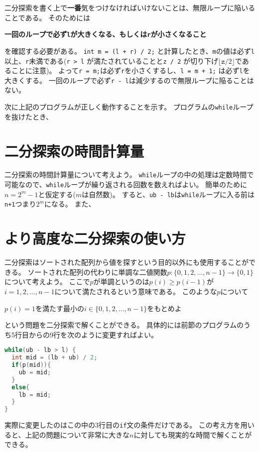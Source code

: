 \documentclass[a4paper,twoside,onecolumn,openany,article,10pt]{memoir}
\theoremstyle{remark}
\begin{document}
二分探索を書く上で\textbf{一番}気をつけなければいけないことは、無限ループに陥いることである。
そのためには
\begin{center}
\textbf{一回のループで必ず\texttt{l}が大きくなる、もしくは\texttt{r}が小さくなること}
\end{center}
を確認する必要がある。
\texttt{int m = (l + r) / 2;} と計算したとき、\texttt{m}の値は必ず\texttt{l}以上、\texttt{r}未満である(\texttt{r > l} が満たされていることと\texttt{z / 2} が切り下げ$\lfloor \mathtt{z} / 2\rfloor$であることに注意)。
よって\texttt{r = m;}は必ず\texttt{r}を小さくするし、\texttt{l = m + 1;} は必ず\texttt{l}を大きくする。
一回のループで必ず\texttt{r - l}は減少するので無限ループに陥ることはない。

次に上記のプログラムが正しく動作することを示す。
プログラムの\texttt{while}ループを抜けたとき、
\fi

\section{二分探索の時間計算量}
二分探索の時間計算量について考えよう。
\texttt{while}ループの中の処理は定数時間で可能なので、\texttt{while}ループが繰り返される回数を数えればよい。
簡単のために$n=2^m-1$と仮定する($m$は自然数)。
すると、\texttt{ub - lb}は\texttt{while}ループに入る前は\texttt{n+1}つまり$2^m$になる。
また、
\fi


\section{より高度な二分探索の使い方}
二分探索はソートされた配列から値を探すという目的以外にも使用することができる。
ソートされた配列の代わりに単調な二値関数$p\colon \{0,1,2,\dotsc,n-1\}\to\{0,1\}$について考えよう。
ここで$p$が単調というのは$p(i)\ge p(i-1)$が$i=1,2,\dotsc,n-1$について満たされるという意味である。
このような$p$について
\begin{center}
$p(i) = 1$を満たす最小の$i\in\{0,1,2,\dotsc,n-1\}$をもとめよ
\end{center}
という問題を二分探索で解くことができる。
具体的には前節のプログラムのうち5行目からの9行を次のように変更すればよい。
\begin{lstlisting}[basicstyle=\ttfamily\small,showstringspaces=false,language=C,frame=single]
while(ub - lb > l) {
  int mid = (lb + ub) / 2;
  if(p(mid)){
    ub = mid;
  }
  else{
    lb = mid;
  }
}
\end{lstlisting}
実際に変更したのはこの中の3行目の\texttt{if}文の条件だけである。
この考え方を用いると、上記の問題について非常に大きな$n$に対しても現実的な時間で解くことができる。
\end{document}
